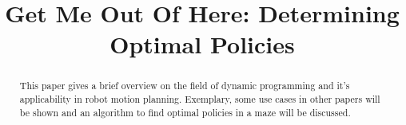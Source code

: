 \documentclass[conference]{IEEEtran}
\begin{document}


%
\title{Get Me Out Of Here: Determining Optimal Policies}


\author{
}





\maketitle

\begin{abstract}
This paper gives a brief overview on the field of dynamic programming and it's applicability in robot motion planning. Exemplary, some use cases in other papers will be shown and an algorithm to find optimal policies in a maze will be discussed.
\end{abstract}





%
\IEEEpeerreviewmaketitle
\end{document}
